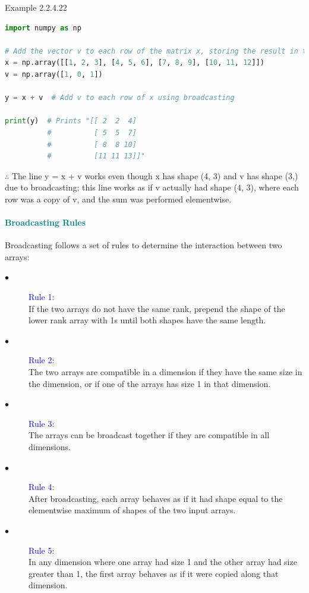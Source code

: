 \documentclass{book}
\begin{document}
\begin{egBox}{Example 2.2.4.22}{}
    \begin{lstlisting}[language=Python, basicstyle=\ttfamily\small, keywordstyle=\color{blue}, commentstyle=\color{forestgreen}, stringstyle=\color{red}, showstringspaces=false]
import numpy as np

# Add the vector v to each row of the matrix x, storing the result in the matrix y
x = np.array([[1, 2, 3], [4, 5, 6], [7, 8, 9], [10, 11, 12]])
v = np.array([1, 0, 1])

y = x + v  # Add v to each row of x using broadcasting

print(y)  # Prints "[[ 2  2  4]
          #          [ 5  5  7]
          #          [ 8  8 10]
          #          [11 11 13]]"

    \end{lstlisting}
    $\therefore$ The line y = x + v works even though x has shape (4, 3) and v has shape (3,) due to broadcasting; this line works as if v actually had shape (4, 3), where each row was a copy of v, and the sum was performed elementwise.
\end{egBox}
\newpage
\textcolor{teal}{\paragraph{Broadcasting Rules}}
Broadcasting follows a set of rules to determine the interaction between two arrays:
\begin{description}
    \item[$\bullet$] \textcolor{blue}{Rule 1}: \\
    If the two arrays do not have the same rank, prepend the shape of the lower rank array with 1s until both shapes have the same length.
    \item[$\bullet$] \textcolor{blue}{Rule 2}: \\
    The two arrays are compatible in a dimension if they have the same size in the dimension, or if one of the arrays has size 1 in that dimension.
    \item[$\bullet$] \textcolor{blue}{Rule 3}: \\
    The arrays can be broadcast together if they are compatible in all dimensions.
    \item[$\bullet$] \textcolor{blue}{Rule 4}: \\
    After broadcasting, each array behaves as if it had shape equal to the elementwise maximum of shapes of the two input arrays.
    \item[$\bullet$] \textcolor{blue}{Rule 5}: \\
    In any dimension where one array had size 1 and the other array had size greater than 1, the first array behaves as if it were copied along that dimension.
\end{description}
\end{document}
